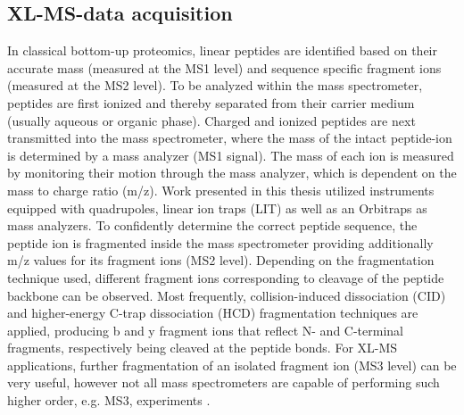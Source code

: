 \subsection{XL-MS-data acquisition}
In classical bottom-up proteomics, linear peptides are identified based on their accurate mass (measured at the MS1 level) and sequence specific fragment ions (measured at the MS2 level). To be analyzed within the mass spectrometer, peptides are first ionized and thereby separated from their carrier medium (usually aqueous or organic phase). Charged and ionized peptides are next transmitted into the mass spectrometer, where the mass of the intact peptide-ion is determined by a mass analyzer (MS1 signal). The mass of each ion is measured by monitoring their motion through the mass analyzer, which is dependent on the mass to charge ratio (m/z). Work presented in this thesis utilized instruments equipped with quadrupoles, linear ion traps (LIT) as well as an Orbitraps as mass analyzers. To confidently determine the correct peptide sequence, the peptide ion is fragmented inside the mass spectrometer providing additionally m/z values for its fragment ions (MS2 level). Depending on the fragmentation technique used, different fragment ions corresponding to cleavage of the peptide backbone can be observed. Most frequently, collision-induced dissociation (CID) \cite{Hunt_1986} and higher-energy C-trap dissociation (HCD) \cite{Olsen_2007} fragmentation techniques are applied, producing b and y fragment ions that reflect N- and C-terminal fragments, respectively being cleaved at the peptide bonds. For XL-MS applications, further fragmentation of an isolated fragment ion (MS3 level) can be very useful, however not all mass spectrometers are capable of performing such higher order, e.g. MS3, experiments \cite{Liu_2017a, Lossl_2016}.\\
